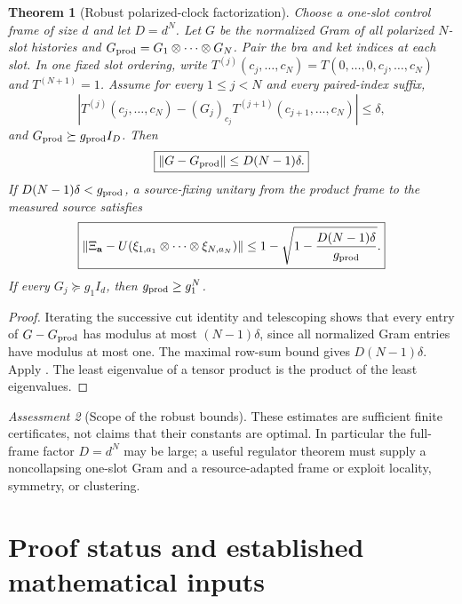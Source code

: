 \documentclass[11pt]{article}
\newtheorem{theorem}{Theorem}[section]
\theoremstyle{definition}
\theoremstyle{remark}
\newtheorem{assessment}[theorem]{Assessment}
\newcommand{\norm}[1]{\lVert#1\rVert}
\begin{document}
\begin{theorem}[Robust polarized-clock factorization]
\label{thm:robust-clock-factorization-master}
Choose a one-slot control frame of size $d$ and let $D=d^N$.  Let $G$ be the
normalized Gram of all polarized $N$-slot histories and
$G_{\rm prod}=G_1\otimes\cdots\otimes G_N$.  Pair the bra and ket indices at
each slot.  In one fixed slot ordering, write
$T^{(j)}(c_j,\ldots,c_N)=T(0,\ldots,0,c_j,\ldots,c_N)$ and
$T^{(N+1)}=1$.  Assume for every $1\le j<N$ and every paired-index suffix,
\[
 \left|T^{(j)}(c_j,\ldots,c_N)
 -(G_j)_{c_j}T^{(j+1)}(c_{j+1},\ldots,c_N)\right|\le\delta,
\]
and $G_{\rm prod}\succeq g_{\rm prod}I_D$.  Then
\begin{equation}
  \boxed{\norm{G-G_{\rm prod}}\le D(N-1)\delta.}
  \label{eq:robust-Gram-product-master}
\end{equation}
If $D(N-1)\delta<g_{\rm prod}$, a source-fixing unitary from the product frame
to the measured source satisfies
\begin{equation}
  \boxed{
  \norm{\Xi_{\mathbf a}
  -U(\xi_{1,a_1}\otimes\cdots\otimes\xi_{N,a_N})}
  \le
  1-\sqrt{1-\frac{D(N-1)\delta}{g_{\rm prod}}}.}
  \label{eq:robust-source-product-master}
\end{equation}
If every $G_j\succeq g_1I_d$, then $g_{\rm prod}\ge g_1^N$.
\end{theorem}

\begin{proof}
Iterating the successive cut identity and telescoping shows that every entry of
$G-G_{\rm prod}$ has modulus at most $(N-1)\delta$, since all normalized Gram
entries have modulus at most one.  The maximal row-sum bound gives
$D(N-1)\delta$.  Apply .  The least
eigenvalue of a tensor product is the product of the least eigenvalues.
\end{proof}

\begin{assessment}[Scope of the robust bounds]
These estimates are sufficient finite certificates, not claims that their
constants are optimal.  In particular the full-frame factor $D=d^N$ may be
large; a useful regulator theorem must supply a noncollapsing one-slot Gram and
a resource-adapted frame or exploit locality, symmetry, or clustering.
\end{assessment}

\section{Proof status and established mathematical inputs}
\label{app:proof-status}
\end{document}
